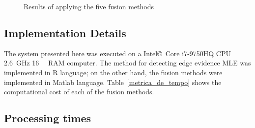 \documentclass[journal]{IEEEtran}
\begin{document}
\begin{figure}[hbt]
{     }
     \caption{Results of applying the five fusion methods}
     \label{fusion_met}
\end{figure}

\subsection{Implementation Details}
The system presented here was executed on a Intel\copyright\ Core i7-9750HQ CPU \SI{2.6}{\giga\hertz} \SI{16}{\giga\byte} RAM computer.  
The method for detecting edge evidence MLE was implemented in R language; on the other hand, the fusion methods were implemented in Matlab language. 
Table~\ref{metrica_de_tempo} shows the computational cost of each of the fusion methods.

\subsection{Processing times} 
\end{document}
